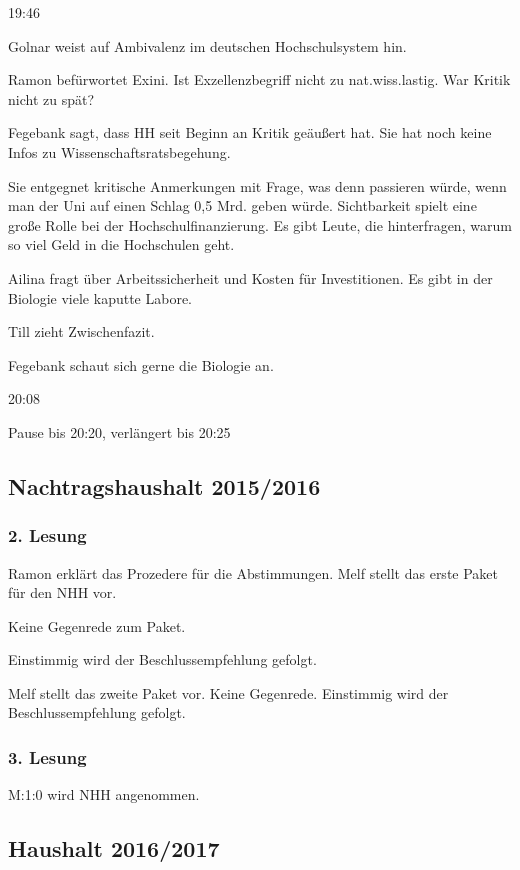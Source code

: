 \documentclass[ngerman,headheight=70pt]{scrartcl}
\begin{document}
    19:46

    Golnar weist auf Ambivalenz im deutschen Hochschulsystem hin.

    Ramon befürwortet Exini. Ist Exzellenzbegriff nicht zu nat.wiss.lastig.
    War Kritik nicht zu spät?

    Fegebank sagt, dass HH seit Beginn an Kritik geäußert hat. Sie hat noch keine
    Infos zu Wissenschaftsratsbegehung.

    Sie entgegnet kritische Anmerkungen mit Frage, was denn passieren würde, wenn
    man der Uni auf einen Schlag 0,5 Mrd. geben würde.
    Sichtbarkeit spielt eine große Rolle bei der Hochschulfinanzierung.
    Es gibt Leute, die hinterfragen, warum so viel Geld in die Hochschulen
    geht.

    Ailina fragt über Arbeitssicherheit und Kosten für Investitionen.
    Es gibt in der Biologie viele kaputte Labore.

    Till zieht Zwischenfazit.

    Fegebank schaut sich gerne die Biologie an.

    20:08

    Pause bis 20:20, verlängert bis 20:25

    \subsection{Nachtragshaushalt 2015/2016}
    \subsubsection{2. Lesung}

    Ramon erklärt das Prozedere für die Abstimmungen. Melf stellt das erste
    Paket für den NHH vor.

    Keine Gegenrede zum Paket.

    Einstimmig wird der Beschlussempfehlung gefolgt.

    Melf stellt das zweite Paket vor. Keine Gegenrede. Einstimmig wird der
    Beschlussempfehlung gefolgt.

    \subsubsection{3. Lesung}

    M:1:0 wird NHH angenommen.

    \subsection{Haushalt 2016/2017}
\end{document}
